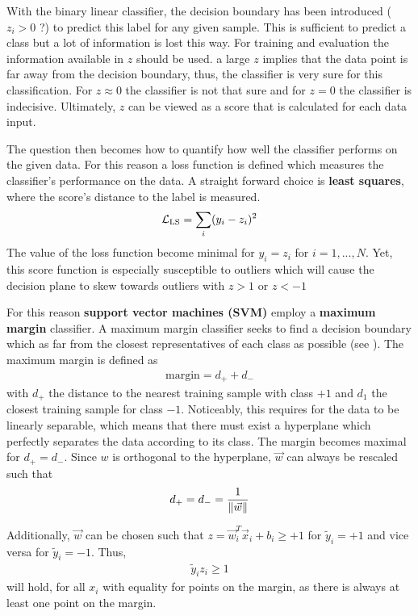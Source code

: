 With the binary linear classifier, the decision boundary has been introduced ($z_i > 0$ ?) to predict this label for any given sample.
This is sufficient to predict a class but a lot of information is lost this way.
For training and evaluation the information available in $z$ should be used.
\eg a large $z$ implies that the data point is far away from the decision boundary, thus, the classifier is very sure for this classification.
For $z \approx 0$ the classifier is not that sure and for $z = 0$ the classifier is indecisive.
Ultimately, $z$ can be viewed as a score that is calculated for each data input.

The question then becomes how to quantify how well the classifier performs on the given data.
For this reason a loss function is defined which measures the classifier's performance on the data.
A straight forward choice is \textbf{least squares}, where the score's distance to the label is measured.
\begin{align}
    \mathcal{L}_{\text{LS}} = \sum_i (y_i - z_i)^2
\end{align}
The value of the loss function become minimal for $y_i = z_i$ for $i = 1,...,N$.
Yet, this score function is especially susceptible to outliers which will cause the decision plane to skew towards outliers with $z > 1$ or $z < -1$

For this reason \textbf{support vector machines (SVM)} employ a \textbf{maximum margin} classifier.
A maximum margin classifier seeks to find a decision boundary which as far from the closest representatives of each class as possible (see ).
The maximum margin is defined as
\begin{align}
    \text{margin} = d_+ + d_-
\end{align}
with $d_+$ the distance to the nearest training sample with class $+1$ and $d_1$ the closest training sample for class $-1$.
Noticeably, this requires for the data to be linearly separable, which means that there must exist a hyperplane which perfectly separates the data according to its class.
The margin becomes maximal for $d_+ = d_-$.
Since $w$ is orthogonal to the hyperplane, $\vec{w}$ can always be rescaled such that 
\begin{align}
    d_+ = d_- = \frac{1}{\left\lVert\vec{w}\right\rVert}
\end{align}

Additionally, $\vec{w}$ can be chosen such that $z = \vec{w}_i^T \vec{x}_i + b_i \geq +1$ for $\tilde{y}_i = +1$ and vice versa for $\tilde{y}_i = -1$.
Thus,
\begin{align}
    \tilde{y}_i z_i \geq 1
\end{align}
will hold, for all $x_i$ with equality for points on the margin, as there is always at least one point on the margin.

